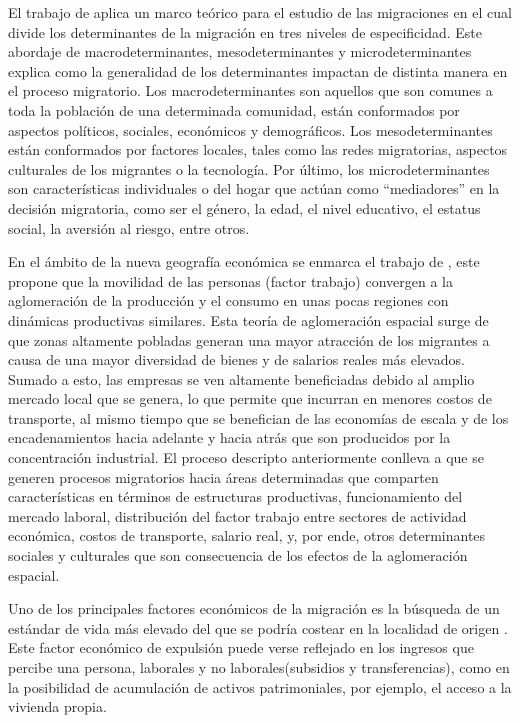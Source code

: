 \documentclass[12pt,a4paper]{article}
\begin{document}
El trabajo de \textcite{kuhnt_literature_2019} aplica un marco teórico para el estudio de las migraciones en el cual divide los determinantes de la migración en tres niveles de especificidad. Este abordaje de macrodeterminantes, mesodeterminantes y microdeterminantes explica como la generalidad de los determinantes impactan de distinta manera en el proceso migratorio. Los macrodeterminantes son aquellos que son comunes a toda la población de una determinada comunidad, están conformados por aspectos políticos, sociales, económicos y demográficos. Los mesodeterminantes están conformados por factores locales, tales como las redes migratorias, aspectos culturales de los migrantes o la tecnología. Por último, los microdeterminantes son características individuales o del hogar que actúan como ``mediadores'' en la decisión migratoria, como ser el género, la edad, el nivel educativo, el estatus social, la aversión al riesgo, entre otros. 

En el ámbito de la nueva geografía económica se enmarca el trabajo de \textcite{krugman_increasing_1991}, este  propone que la movilidad de las personas (factor trabajo) convergen a la aglomeración de la producción y el consumo en unas pocas regiones con dinámicas productivas similares. Esta teoría de aglomeración espacial surge de que  zonas altamente pobladas generan una mayor atracción de los migrantes a causa de una mayor diversidad de bienes y de salarios reales más elevados. Sumado a esto, las empresas se ven altamente beneficiadas debido al amplio mercado local que se genera, lo que permite que incurran en menores costos de transporte, al mismo tiempo que se benefician de las economías de escala y de los encadenamientos hacia adelante y hacia atrás que son producidos por la concentración industrial. El proceso descripto anteriormente conlleva a que se generen procesos migratorios hacia áreas determinadas que comparten características en términos de estructuras productivas, funcionamiento del mercado laboral, distribución del factor trabajo entre sectores de actividad económica, costos de transporte, salario real, y, por ende, otros determinantes sociales y culturales que son consecuencia de los efectos de la aglomeración espacial.

Uno de los principales factores económicos de la migración es la búsqueda de un estándar de vida más elevado del que se podría costear en la localidad de origen \parencite{simpson_demographic_2017}. Este factor económico de expulsión  puede verse reflejado en los ingresos que percibe una persona, laborales y no laborales(subsidios y transferencias), como en la posibilidad de acumulación de activos patrimoniales, por ejemplo, el acceso a la vivienda propia. 
\end{document}
